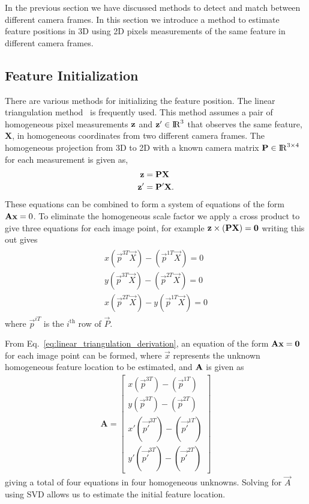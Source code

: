 In the previous section we have discussed methods to detect and match between
different camera frames. In this section we introduce a method to estimate
feature positions in 3D using 2D pixels measurements of the same feature in
different camera frames.

\subsection{Feature Initialization}
\label{subsec:linear_triangulation}

There are various methods for initializing the feature position. The linear
triangulation method~\cite{Hartley2003} is frequently used. This method assumes
a pair of homogeneous pixel measurements ${{\mathbf{z}}}$ and ${{\mathbf{z}}}' \in
{\rm I\!R}^{3}$ that observes the same feature, $\mathbf{X}$, in homogeneous
coordinates from two different camera frames. The homogeneous projection from
3D to 2D with a known camera matrix ${\mathbf{P}} \in {\rm I\!R}^{3 \times 4}$
for each measurement is given as,
%
\begin{align}
\begin{split}
	{{\mathbf{z}}} &= \mathbf{P} \mathbf{X} \\
	{{\mathbf{z}}}' &= \mathbf{P}' \mathbf{X}.
\end{split}
\end{align}
%
These equations can be combined to form a system of equations of the form
${\mathbf{A}} {\mathbf{x}} = 0$. To eliminate the homogeneous scale factor we apply a
cross product to give three equations for each image point, for example
${{\mathbf{z}}} \times ({\mathbf{P}} {\mathbf{X}}) = {\mathbf{0}}$ writing this out gives
%
\begin{align}
\label{eq:linear_triangulation_derivation}
\begin{split}
  x (\Vec{p}^{3T} \Vec{X}) - (\Vec{p}^{1T} \Vec{X}) = 0 \\
  y (\Vec{p}^{3T} \Vec{X}) - (\Vec{p}^{2T} \Vec{X}) = 0 \\
  x (\Vec{p}^{2T} \Vec{X}) - y (\Vec{p}^{1T} \Vec{X}) = 0
\end{split}
\end{align}
%
where $\Vec{p}^{iT}$ is the $i^{\mbox{th}}$ row of $\Vec{P}$.

From Eq.~\eqref{eq:linear_triangulation_derivation}, an equation of the form
${\mathbf{A}} {\mathbf{x}} = {\mathbf{0}}$ for each image point can be formed, where
$\Vec{x}$ represents the unknown homogeneous feature location to be
estimated, and ${\mathbf{A}}$ is given as
%
\begin{align}
  \mathbf{A} =
  \begin{bmatrix}
    x (\Vec{p}^{3T}) - (\Vec{p}^{1T}) \\
    y (\Vec{p}^{3T}) - (\Vec{p}^{2T}) \\
    x' (\Vec{p'}^{3T}) - (\Vec{p'}^{1T}) \\
    y' (\Vec{p'}^{3T}) - (\Vec{p'}^{2T})
  \end{bmatrix}
  \label{eq:linear_triangulation_ derivation}
\end{align}
%
giving a total of four equations in four homogeneous unknowns. Solving for
$\Vec{A}$ using SVD allows us to estimate the initial feature location.


